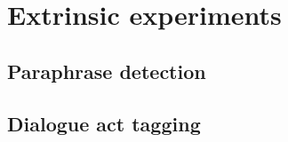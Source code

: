 
\chapter{Extrinsic experiments}
\label{cha:extr-exper}


\section{Paraphrase detection}
\label{sec:paraphrase-detection}

\section{Dialogue act tagging}
\label{sec:exp-dialogue-act-tagging}



